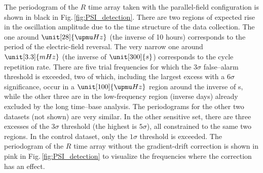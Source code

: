 The periodogram of the $R$ time array taken with the parallel-field configuration is shown in black in Fig.\,\ref{fig:PSI_detection}.
There are two regions of expected rise in the oscillation amplitude due to the time structure of the data collection.
The one around $\unit[28]{\upmu Hz}$ (the inverse of 10 hours) corresponds to the period of the electric-field reversal.
The very narrow one around $\unit[3.3]{mHz}$ (the inverse of $\unit[300]{s}$) corresponds to the cycle repetition rate.
There are five
trial frequencies for which the $3\sigma$ false--alarm threshold is exceeded,
two of which, including the largest excess with a $6\sigma$ significance, occur in a $\unit[100]{\upmu Hz}$ region around the inverse of \unit[300]{s}, while the other three are in the low-frequency region (inverse days) already excluded by the long time--base analysis.
 The periodograms for the other two datasets (not shown) are very similar.
In the other sensitive set, there are three excesses of the $3\sigma$ threshold (the highest is $5\sigma$), all constrained to the same two regions. In the control dataset, only the $1\sigma$ threshold is exceeded.
The periodogram of the $R$ time array without the gradient-drift correction is shown in pink in Fig.\,\ref{fig:PSI_detection} to visualize the frequencies where the correction has an effect.


